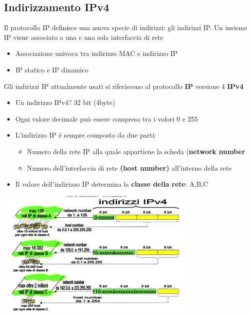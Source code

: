 \documentclass{article}
\begin{document}
\subsection{Indirizzamento IPv4}
Il protocollo IP definisce una nuova specie di indirizzi: gli indirizzi IP. Un insieme IP viene associato a una e una sola interfaccia di rete
\begin{itemize}
    \item Associazione univoca tra indirizzo MAC e indirizzo IP
    \item IP statico e IP dinamico
\end{itemize}
Gli indirizzi IP attualmente usati si riferiscono al protocollo \textbf{IP} versione 4 \textbf{IPv4}
\begin{itemize}
    \item Un indirizzo IPv4? 32 bit (4byte)
    \item Ogni valore decimale pu\`o essere compreso tra i volori 0 e 255
    \item L'indirizzo IP \'e sempre composto da due parti:
    \begin{itemize}
        \item Numero della rete IP alla quale appartiene la scheda (\textbf{network number}
        \item Numero dell'interfaccia di rete \textbf{(host number)} all'interno della rete
    \end{itemize}
    \item Il valore dell'indirizzo IP determina la \textbf{classe della rete}: A,B,C
\end{itemize}
\begin{center}
    \includegraphics[width=10cm]{img/ipv4.png}
\end{center}
\end{document}
